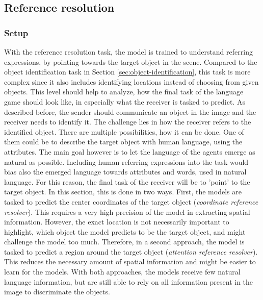 \subsection{Reference resolution}
\label{sec:reference_resolution}
\subsubsection*{Setup}
With the reference resolution task, the model is trained to understand referring expressions, by pointing towards the target object in the scene.
Compared to the object identification task in Section \ref{sec:object-identification}, this task is more complex since it also includes identifying locations instead of choosing from given objects.
This level should help to analyze, how the final task of the language game should look like, in especially what the receiver is tasked to predict.
As described before, the sender should communicate an object in the image and the receiver needs to identify it.
The challenge lies in how the receiver refers to the identified object.
There are multiple possibilities, how it can be done.
One of them could be to describe the target object with human language, using the attributes.
The main goal however is to let the language of the agents emerge as natural as possible.
Including human referring expressions into the task would bias also the emerged language towards attributes and words, used in natural language.
For this reason, the final task of the receiver will be to 'point' to the target object.
In this section, this is done in two ways.
First, the models are tasked to predict the center coordinates of the target object (\emph{coordinate reference resolver}).
This requires a very high precision of the model in extracting spatial information.
However, the exact location is not necessarily important to highlight, which object the model predicts to be the target object, and might challenge the model too much.
Therefore, in a second approach, the model is tasked to predict a region around the target object (\emph{attention reference resolver}).
This reduces the necessary amount of spatial information and might be easier to learn for the models.
With both approaches, the models receive few natural language information, but are still able to rely on all information present in the image to discriminate the objects.

